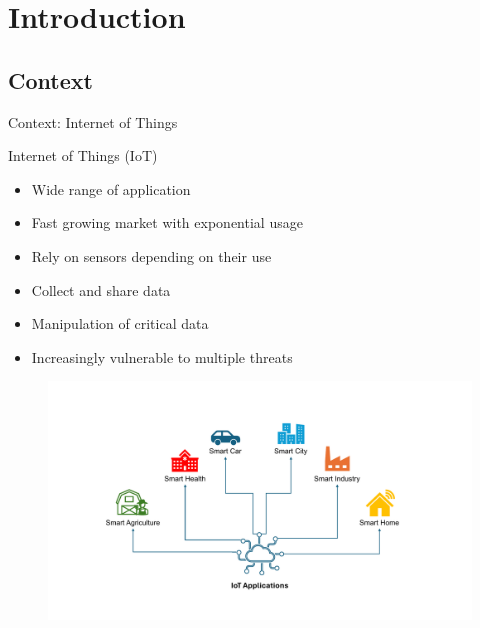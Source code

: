 \section*{Introduction}

\subsection{Context}
\begin{frame}{Context: Internet of Things}
    \begin{minipage}[c]{0.5\textwidth}
        \begin{block}{Internet of Things (IoT)}
            \begin{itemize}
                [square]
                \justifying
                \item Wide range of application
                \item Fast growing market with exponential usage
                \item Rely on sensors depending on their use
                \item Collect and share data
                \item Manipulation of critical data
                \item Increasingly vulnerable to multiple threats
            \end{itemize}
        \end{block}
    \end{minipage}\hfill%
    \begin{minipage}[c]{0.5\textwidth}
        \begin{figure}
            \centering
            \includegraphics[width=.825\textwidth, trim={4.5cm 2.25cm 5.75cm 3.25cm}, clip]{src/1_introduction/img/iotapplications.pdf}

\end{figure}
\end{minipage}
\end{frame}
